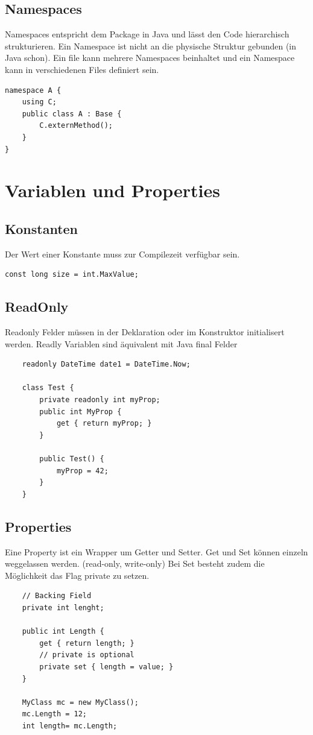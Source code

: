 \documentclass[
a4paper,
oneside,
10pt,
fleqn,
headsepline,
toc=listofnumbered, 
bibliography=totocnumbered]{scrartcl}
\let\stdsection\section
\renewcommand\section{\clearpage\stdsection}
\begin{document}
\subsection{Namespaces}
Namespaces entspricht dem Package in Java und lässt den Code hierarchisch strukturieren. Ein Namespace ist nicht an die physische Struktur gebunden (in Java schon). Ein file kann mehrere Namespaces beinhaltet und ein Namespace kann in verschiedenen Files definiert sein.
\begin{lstlisting}
namespace A {
	using C;
	public class A : Base {
		C.externMethod();
	}
}
\end{lstlisting}

\section{Variablen und Properties}
\subsection{Konstanten}
Der Wert einer Konstante muss zur Compilezeit verfügbar sein.
\begin{lstlisting}
const long size = int.MaxValue;
\end{lstlisting}

\subsection{ReadOnly}
Readonly Felder müssen in der Deklaration oder im Konstruktor initialisert werden. Readly Variablen sind äquivalent mit Java final Felder
\begin{lstlisting}
	readonly DateTime date1 = DateTime.Now;
	
	class Test {
		private readonly int myProp;
		public int MyProp {
			get { return myProp; }
		}
		
		public Test() {
			myProp = 42;
		}
	}
\end{lstlisting}

\subsection{Properties}
Eine Property ist ein Wrapper um Getter und Setter. Get und Set können einzeln weggelassen werden. (read-only, write-only) Bei Set besteht zudem die Möglichkeit das Flag private zu setzen.
\begin{lstlisting}
	// Backing Field
	private int lenght;
	
	public int Length {
		get { return length; }
		// private is optional
		private set { length = value; } 
	}
	
	MyClass mc = new MyClass();
	mc.Length = 12;
	int length= mc.Length;
	
\end{lstlisting}
\end{document}

